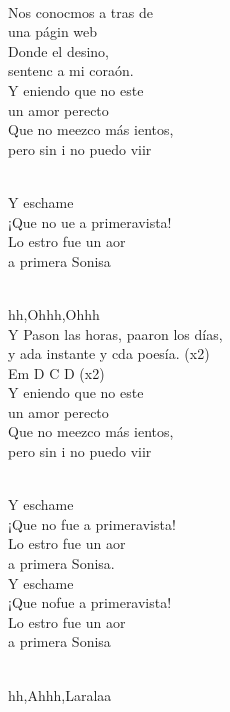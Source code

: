\begin{cancion}%
{}\vspace*{-0.4cm}\\
	Nos conocmos a tras de  \\
	una págin web\\
	Donde el desino, \\
	sentenc a mi coraón. \\
\jump
	Y eniendo que no este \\
	un amor perecto\\
	Que no meezco más ientos, \\
	pero sin i no puedo viir\\\jump\\
	\begin{chorus}%
	Y eschame  \\
	¡Que no ue a primeravista!\\
	Lo estro fue un aor \\
	a primera Sonisa\\
	\end{chorus}%
	\jump\\
	hh,Ohhh,Ohhh       \\
\jump
	Y Pason las horas, paaron los días,\\
	y ada instante y cda poesía. (x2)\\
Em D C D (x2)\\
\jump
	Y eniendo que no este \\
	un amor perecto\\
	Que no meezco más ientos, \\
	pero sin i no puedo viir\\\jump\\
	\begin{chorus}%
	Y eschame  \\
	¡Que no fue a primeravista!\\
	Lo estro fue un aor \\
	a primera Sonisa.\\
\jump
	Y eschame  \\
	¡Que nofue a primeravista!\\
	Lo estro fue un aor \\
	a primera Sonisa\\
	\end{chorus}%
	\jump\\
	hh,Ahhh,Laralaa           \\
\end{cancion}%
